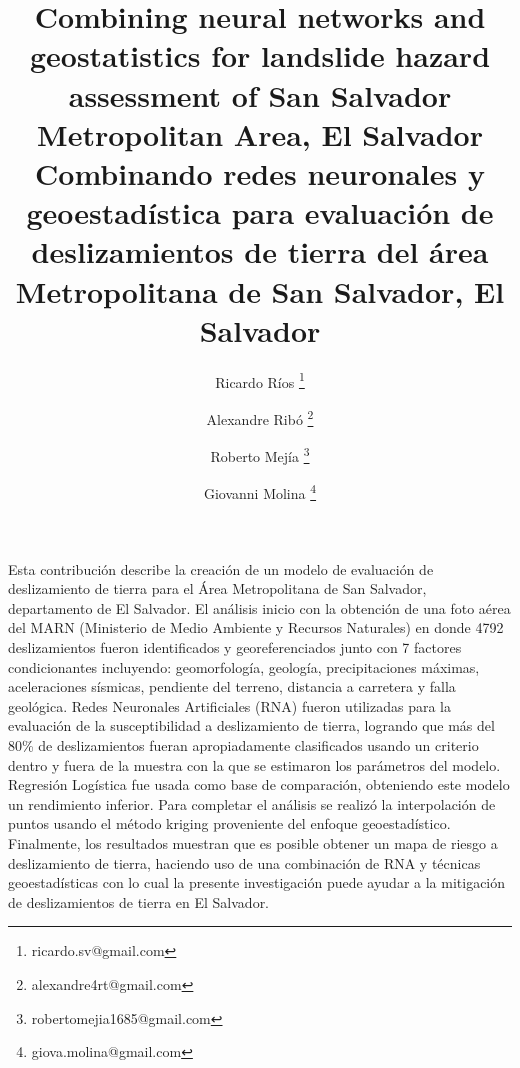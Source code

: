 \documentclass[11pt,twoside]{rmta2010eng}%
\begin{document}
\title{Combining neural networks and geostatistics for landslide hazard assessment of San Salvador Metropolitan Area, El Salvador 
\newline
\newline
Combinando redes neuronales y geoestad\'{i}stica para evaluaci\'{o}n de deslizamientos de tierra del \'{a}rea Metropolitana de San Salvador, El Salvador}

\author[1]{Ricardo R\'{i}os \thanks{ricardo.sv@gmail.com}}
\author[2]{Alexandre Rib\'{o} \thanks{alexandre4rt@gmail.com}}
\author[3]{Roberto Mej\'{i}a \thanks{robertomejia1685@gmail.com}}
\author[4]{Giovanni Molina \thanks{giova.molina@gmail.com}}


\date{}

\maketitle



\begin{resumen}
Esta contribuci\'{o}n describe la creaci\'{o}n de un modelo de evaluaci\'{o}n de deslizamiento de tierra para el \'{A}rea Metropolitana de San Salvador, departamento de El Salvador. El an\'{a}lisis inicio con la obtenci\'{o}n de una foto a\'{e}rea del MARN (Ministerio de Medio Ambiente y Recursos Naturales) en donde 4792 deslizamientos fueron identificados y georeferenciados junto con 7 factores condicionantes incluyendo: geomorfolog\'{i}a, geolog\'{i}a, precipitaciones m\'{a}ximas, aceleraciones s\'{i}smicas, pendiente del terreno, distancia a carretera y falla geol\'{o}gica. Redes Neuronales Artificiales (RNA) fueron utilizadas para la evaluaci\'{o}n de la susceptibilidad a deslizamiento de tierra, logrando que m\'{a}s del 80\% de deslizamientos fueran apropiadamente clasificados usando un criterio dentro y fuera de la muestra con la que se estimaron los par\'{a}metros del modelo. Regresi\'{o}n Log\'{i}stica fue usada como base de comparaci\'{o}n, obteniendo este modelo un rendimiento inferior. Para completar el an\'{a}lisis se realiz\'{o} la interpolaci\'{o}n de puntos usando el m\'{e}todo kriging proveniente del enfoque geoestad\'{i}stico. Finalmente, los resultados muestran que es posible obtener un mapa de riesgo a deslizamiento de tierra, haciendo uso de una combinaci\'{o}n de RNA y t\'{e}cnicas geoestad\'{i}sticas con lo cual la presente investigaci\'{o}n puede ayudar a la mitigaci\'{o}n de deslizamientos de tierra en El Salvador.
\end{resumen}
\end{document}
